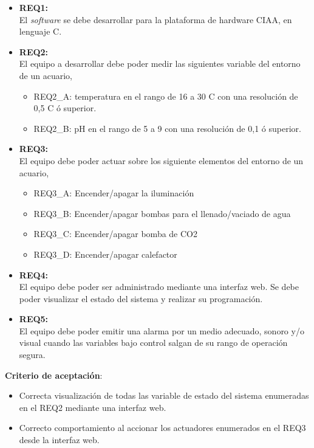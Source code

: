 \begin{itemize}
	\item \textbf{REQ1:}\\ El \textit{software} se debe desarrollar para la plataforma de hardware CIAA, en lenguaje C.
	\item \textbf{REQ2:}\\ El equipo a desarrollar debe poder medir las siguientes variable del entorno de un acuario,
	\begin{itemize}
		\item REQ2\_A: temperatura en el rango de 16 a 30 \grados C con una resolución de 0,5 \grados C ó superior.
		\item REQ2\_B: pH en el rango de 5 a 9 con una resolución de 0,1 ó superior.
	\end{itemize}
	\item \textbf{REQ3:}\\ El equipo debe poder actuar sobre los siguiente elementos del entorno de un acuario,
	\begin{itemize}
		\item REQ3\_A: Encender/apagar la iluminación
		\item REQ3\_B: Encender/apagar bombas para el llenado/vaciado de agua
		\item REQ3\_C: Encender/apagar bomba de CO2
		\item REQ3\_D: Encender/apagar calefactor
	\end{itemize}
	\item \textbf{REQ4:}\\ El equipo debe poder ser administrado mediante una interfaz web. Se debe poder visualizar el estado del sistema y realizar su programación.
	\item \textbf{REQ5:}\\ El equipo debe poder emitir una alarma por un medio adecuado, sonoro y/o visual cuando las variables bajo control salgan de su rango de operación segura.
\end{itemize}

\textbf{Criterio de aceptación}:
	\begin{itemize}
		\item Correcta visualización de todas las variable de estado del sistema enumeradas en el REQ2 mediante una interfaz web.
		\item Correcto comportamiento al accionar los actuadores enumerados en el REQ3 desde la interfaz web.
	\end{itemize}

